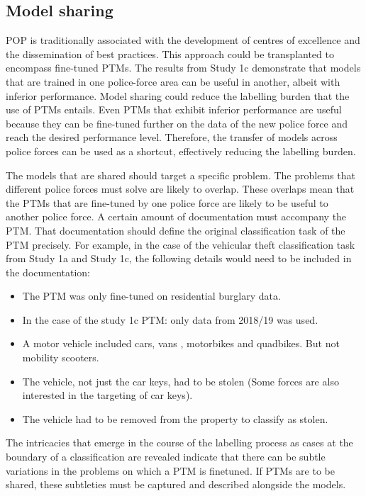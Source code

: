 \subsection{Model sharing} POP is traditionally associated with the development of centres of excellence and the dissemination of best practices. This approach could be transplanted to encompass fine-tuned PTMs. The results from Study 1c demonstrate that models that are trained in one police-force area can be useful in another, albeit with inferior performance. Model sharing could reduce the labelling burden that the use of PTMs entails. Even PTMs that exhibit inferior performance are useful because they can be fine-tuned further on the data of the new police force and reach the desired performance level. Therefore, the transfer of models across police forces can be used as a shortcut, effectively reducing the labelling burden.

The models that are shared should target a specific problem. The problems that different police forces must solve are likely to overlap. These overlaps mean that the PTMs that are fine-tuned by one police force are likely to be useful to another police force. A certain amount of documentation must accompany the PTM. That documentation should define the original classification task of the PTM precisely. For example, in the case of the vehicular theft classification task from Study 1a and Study 1c, the following details would need to be included in the documentation:


\begin{itemize}

\item The PTM was only fine-tuned on residential burglary data.

\item In the case of the study 1c PTM: only data from 2018/19 was used.

\item A motor vehicle included cars, vans , motorbikes and quadbikes. But not mobility scooters.

\item The vehicle, not just the car keys, had to be stolen (Some forces are also interested in the targeting of car keys).

\item The vehicle had to be removed from the property to classify as stolen.

\end{itemize}

The intricacies that emerge in the course of the labelling process as cases at the boundary of a classification are revealed indicate that there can be subtle variations in the problems on which a PTM is finetuned. If PTMs are to be shared, these subtleties must be captured and described alongside the models.

